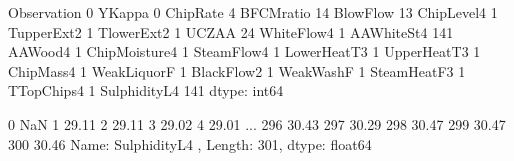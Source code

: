 \documentclass[letterpaper,10pt,english]{jupyterBook}
\begin{document}
\begin{sphinxVerbatim}[commandchars=\\\{\}]
\end{sphinxVerbatim}

\begin{sphinxVerbatim}[commandchars=\\\{\}]
Observation          0
Y\PYGZhy{}Kappa              0
ChipRate             4
BF\PYGZhy{}CMratio          14
BlowFlow            13
ChipLevel4           1
T\PYGZhy{}upperExt\PYGZhy{}2         1
T\PYGZhy{}lowerExt\PYGZhy{}2         1
UCZAA               24
WhiteFlow\PYGZhy{}4          1
AAWhiteSt\PYGZhy{}4        141
AA\PYGZhy{}Wood\PYGZhy{}4            1
ChipMoisture\PYGZhy{}4       1
SteamFlow\PYGZhy{}4          1
Lower\PYGZhy{}HeatT\PYGZhy{}3        1
Upper\PYGZhy{}HeatT\PYGZhy{}3        1
ChipMass\PYGZhy{}4           1
WeakLiquorF          1
BlackFlow\PYGZhy{}2          1
WeakWashF            1
SteamHeatF\PYGZhy{}3         1
T\PYGZhy{}Top\PYGZhy{}Chips\PYGZhy{}4        1
SulphidityL\PYGZhy{}4      141
dtype: int64
\end{sphinxVerbatim}

\begin{sphinxVerbatim}[commandchars=\\\{\}]
\PYG{p}{[}\PYG{p}{]}
\end{sphinxVerbatim}

\begin{sphinxVerbatim}[commandchars=\\\{\}]
0        NaN
1      29.11
2      29.11
3      29.02
4      29.01
       ...  
296    30.43
297    30.29
298    30.47
299    30.47
300    30.46
Name: SulphidityL\PYGZhy{}4 , Length: 301, dtype: float64
\end{sphinxVerbatim}

\begin{sphinxVerbatim}[commandchars=\\\{\}]
  
\end{sphinxVerbatim}
\end{document}
